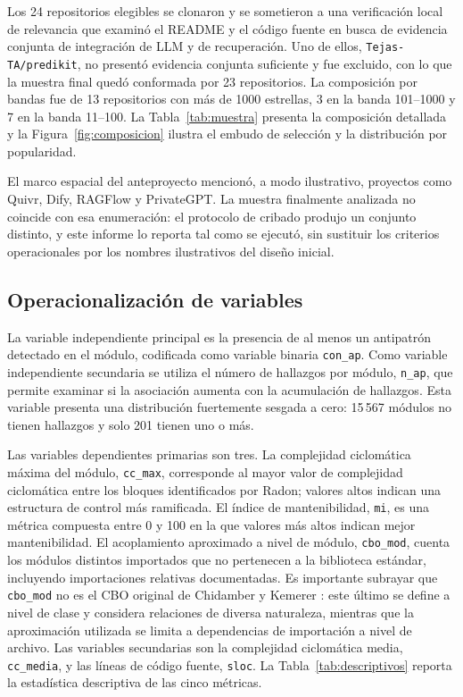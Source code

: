 Los 24 repositorios elegibles se clonaron y se sometieron a una verificación local de relevancia que examinó el README y el código fuente en busca de evidencia conjunta de integración de LLM y de recuperación. Uno de ellos, \texttt{Tejas-TA/predikit}, no presentó evidencia conjunta suficiente y fue excluido, con lo que la muestra final quedó conformada por 23 repositorios. La composición por bandas fue de 13 repositorios con más de 1000 estrellas, 3 en la banda 101--1000 y 7 en la banda 11--100. La Tabla~\ref{tab:muestra} presenta la composición detallada y la Figura~\ref{fig:composicion} ilustra el embudo de selección y la distribución por popularidad.

El marco espacial del anteproyecto mencionó, a modo ilustrativo, proyectos como Quivr, Dify, RAGFlow y PrivateGPT. La muestra finalmente analizada no coincide con esa enumeración: el protocolo de cribado produjo un conjunto distinto, y este informe lo reporta tal como se ejecutó, sin sustituir los criterios operacionales por los nombres ilustrativos del diseño inicial.

\subsection{Operacionalización de variables}

La variable independiente principal es la presencia de al menos un antipatrón detectado en el módulo, codificada como variable binaria \texttt{con\_ap}. Como variable independiente secundaria se utiliza el número de hallazgos por módulo, \texttt{n\_ap}, que permite examinar si la asociación aumenta con la acumulación de hallazgos. Esta variable presenta una distribución fuertemente sesgada a cero: 15\,567 módulos no tienen hallazgos y solo 201 tienen uno o más.

Las variables dependientes primarias son tres. La complejidad ciclomática máxima del módulo, \texttt{cc\_max}, corresponde al mayor valor de complejidad ciclomática entre los bloques identificados por Radon; valores altos indican una estructura de control más ramificada. El índice de mantenibilidad, \texttt{mi}, es una métrica compuesta entre 0 y 100 en la que valores más altos indican mejor mantenibilidad. El acoplamiento aproximado a nivel de módulo, \texttt{cbo\_mod}, cuenta los módulos distintos importados que no pertenecen a la biblioteca estándar, incluyendo importaciones relativas documentadas. Es importante subrayar que \texttt{cbo\_mod} no es el CBO original de Chidamber y Kemerer \cite{chidamber_metrics_1994}: este último se define a nivel de clase y considera relaciones de diversa naturaleza, mientras que la aproximación utilizada se limita a dependencias de importación a nivel de archivo. Las variables secundarias son la complejidad ciclomática media, \texttt{cc\_media}, y las líneas de código fuente, \texttt{sloc}. La Tabla~\ref{tab:descriptivos} reporta la estadística descriptiva de las cinco métricas.

